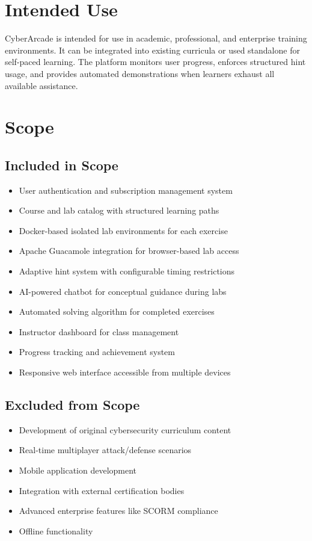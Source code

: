 \documentclass[12pt,a4paper]{report}
\begin{document}
\section{Intended Use}

CyberArcade is intended for use in academic, professional, and enterprise training environments. It
can be integrated into existing curricula or used standalone for self-paced learning. The platform
monitors user progress, enforces structured hint usage, and provides automated demonstrations when
learners exhaust all available assistance.

\section{Scope}

\subsection{Included in Scope}
\begin{itemize}
  \item User authentication and subscription management system
  \item Course and lab catalog with structured learning paths
  \item Docker-based isolated lab environments for each exercise
  \item Apache Guacamole integration for browser-based lab access
  \item Adaptive hint system with configurable timing restrictions
  \item AI-powered chatbot for conceptual guidance during labs
  \item Automated solving algorithm for completed exercises
  \item Instructor dashboard for class management
  \item Progress tracking and achievement system
  \item Responsive web interface accessible from multiple devices
\end{itemize}

\subsection{Excluded from Scope}
\begin{itemize}
  \item Development of original cybersecurity curriculum content
  \item Real-time multiplayer attack/defense scenarios
  \item Mobile application development
  \item Integration with external certification bodies
  \item Advanced enterprise features like SCORM compliance
  \item Offline functionality
\end{itemize}
\end{document}
